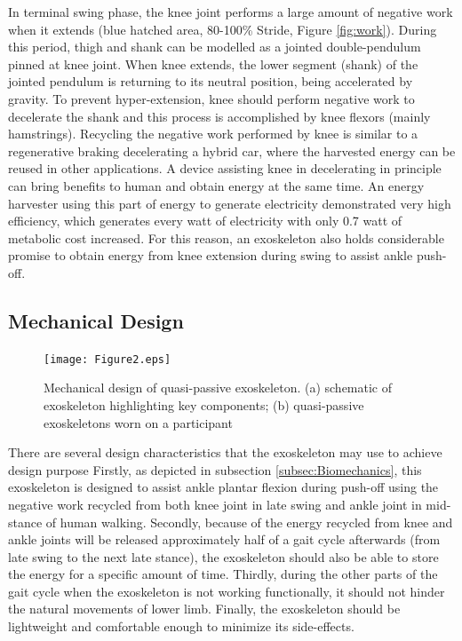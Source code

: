 \documentclass[twocolumn,cleanfoot,10pt]{asme2ej}
\begin{document}
In terminal swing phase, the knee joint performs a large amount of negative work when it extends (blue hatched area, 80-100\% Stride, Figure \ref{fig:work}). During this period, thigh and shank can be modelled as a jointed double-pendulum pinned at knee joint\cite{RN2}. When knee extends, the lower segment (shank) of the jointed pendulum is returning to its neutral position, being accelerated by gravity. To prevent hyper-extension, knee should perform negative work to decelerate the shank and this process is accomplished by knee flexors (mainly hamstrings). Recycling the negative work performed by knee is similar to a regenerative braking decelerating a hybrid car, where the harvested energy can be reused in other applications. A device assisting knee in decelerating in principle can bring benefits to human and obtain energy at the same time. An energy harvester using this part of energy to generate electricity demonstrated very high efficiency, which generates every watt of electricity with only 0.7 watt of metabolic cost increased\cite{RN18}. For this reason, an exoskeleton also holds considerable promise to obtain energy from knee extension during swing to assist ankle push-off.

\subsection{Mechanical Design}

\begin{figure}[b]
	\centering
	\texttt{[image: Figure2.eps]}
	\caption{Mechanical design of quasi-passive exoskeleton. (a) schematic of exoskeleton highlighting key components; (b) quasi-passive exoskeletons worn on a participant}
	\label{fig:model}   
\end{figure}

There are several design characteristics that the exoskeleton may use to achieve design purpose Firstly, as depicted in subsection \ref{subsec:Biomechanics}, this exoskeleton is designed to assist ankle plantar flexion during push-off using the negative work recycled from both knee joint in late swing and ankle joint in mid-stance of human walking. Secondly, because of the energy recycled from knee and ankle joints will be released approximately half of a gait cycle afterwards (from late swing to the next late stance), the exoskeleton should also be able to store the energy for a specific amount of time. Thirdly, during the other parts of the gait cycle when the exoskeleton is not working functionally, it should not hinder the natural movements of lower limb. Finally, the exoskeleton should be lightweight and comfortable enough to minimize its side-effects.
\end{document}
